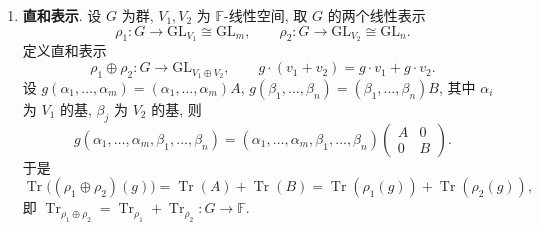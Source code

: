 \begin{example}\label{ex:rep-constructions}
\mbox{}\par\vspace{-0.2em}
\begin{enumerate}
\item \textbf{直和表示}. 设 $G$ 为群, $V_1,V_2$ 为 $\mathbb{F}$-线性空间, 取 $G$ 的两个线性表示
\begin{equation*}
  \rho_1\colon G\to\mathrm{GL}_{V_1}\cong\mathrm{GL}_m,\qquad
  \rho_2\colon G\to\mathrm{GL}_{V_2}\cong\mathrm{GL}_n .
\end{equation*}
定义直和表示
\begin{equation*}
  \rho_1\oplus\rho_2\colon G\longrightarrow\mathrm{GL}_{V_1\oplus V_2},\qquad
  g\cdot(v_1+v_2)=g\cdot v_1+g\cdot v_2 .
\end{equation*}
设 $g(\alpha_1,\dots,\alpha_m)=(\alpha_1,\dots,\alpha_m)A$, $g(\beta_1,\dots,\beta_n)=(\beta_1,\dots,\beta_n)B$,
其中 $\alpha_i$ 为 $V_1$ 的基, $\beta_j$ 为 $V_2$ 的基, 则
\begin{equation*}
  g(\alpha_1,\dots,\alpha_m,\beta_1,\dots,\beta_n)
  =(\alpha_1,\dots,\alpha_m,\beta_1,\dots,\beta_n)\begin{pmatrix}A&0\\0&B\end{pmatrix}.
\end{equation*}
于是
\begin{equation*}
  \operatorname{Tr}\bigl((\rho_1\oplus\rho_2)(g)\bigr)=\operatorname{Tr}(A)+\operatorname{Tr}(B)
  =\operatorname{Tr}(\rho_1(g))+\operatorname{Tr}(\rho_2(g)),
\end{equation*}
即 $\operatorname{Tr}_{\rho_1\oplus\rho_2}=\operatorname{Tr}_{\rho_1}+\operatorname{Tr}_{\rho_2}\colon G\to \mathbb{F}$.


\end{enumerate}
\end{example}

